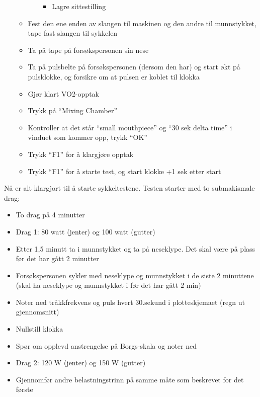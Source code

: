 \documentclass[
  letterpaper,
  DIV=11,
  numbers=noendperiod]{scrartcl}
\providecommand{\tightlist}{%
  \setlength{\itemsep}{0pt}\setlength{\parskip}{0pt}}\usepackage{longtable,booktabs,array}
\begin{document}
\begin{itemize}
\begin{itemize}
\begin{itemize}
      \begin{itemize}
      \tightlist
      \item
        Lagre sittestilling
      \end{itemize}
    \end{itemize}
  \item
    Fest den ene enden av slangen til maskinen og den andre til
    munnstykket, tape fast slangen til sykkelen
  \item
    Ta på tape på forsøkspersonen sin nese
  \item
    Ta på pulsbelte på forsøkspersonen (dersom den har) og start økt på
    pulsklokke, og forsikre om at pulsen er koblet til klokka
  \item
    Gjør klart VO2-opptak
  \item
    Trykk på ``Mixing Chamber''
  \item
    Kontroller at det står ``small mouthpiece'' og ``30 sek delta time''
    i vinduet som kommer opp, trykk ``OK''
  \item
    Trykk ``F1'' for å klargjøre opptak
  \item
    Trykk ``F1'' for å starte test, og start klokke +1 sek etter start
  \end{itemize}
\end{itemize}

Nå er alt klargjort til å starte sykkeltestene. Testen starter med to
submakismale drag:

\begin{itemize}
\tightlist
\item
  To drag på 4 minutter
\item
  Drag 1: 80 watt (jenter) og 100 watt (gutter)
\item
  Etter 1,5 minutt ta i munnstykket og ta på neseklype. Det skal være på
  plass før det har gått 2 minutter
\item
  Forsøkspersonen sykler med neseklype og munnstykket i de siste 2
  minuttene (skal ha neseklype og munnstykket i før det har gått 2 min)
\item
  Noter ned tråkkfrekvens og puls hvert 30.sekund i plotteskjemaet (regn
  ut gjennomsnitt)
\item
  Nullstill klokka
\item
  Spør om opplevd anstrengelse på Borgs-skala og noter ned
\item
  Drag 2: 120 W (jenter) og 150 W (gutter)
\item
  Gjennomfør andre belastningstrinn på samme måte som beskrevet for det
  første
\end{itemize}
\end{document}

